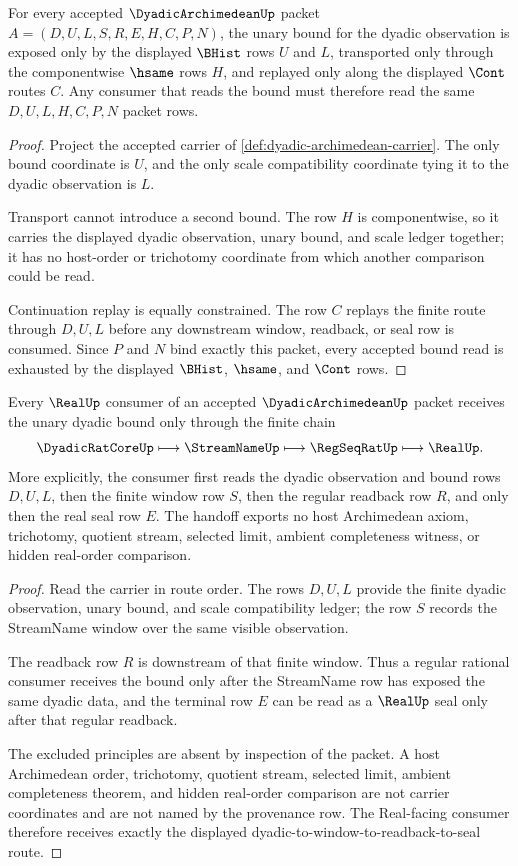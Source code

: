 \begin{theorem}
\label{thm:dyadic-archimedean-unary-bound}
For every accepted $\DyadicArchimedeanUp$ packet $A=(D,U,L,S,R,E,H,C,P,N)$, the unary bound for the dyadic observation is exposed only by the displayed $\BHist$ rows $U$ and $L$, transported only through the componentwise $\hsame$ rows $H$, and replayed only along the displayed $\Cont$ routes $C$. Any consumer that reads the bound must therefore read the same $D,U,L,H,C,P,N$ packet rows.
\end{theorem}
\begin{proof}
Project the accepted carrier of \autoref{def:dyadic-archimedean-carrier}. The only bound coordinate is $U$, and the only scale compatibility coordinate tying it to the dyadic observation is $L$.

Transport cannot introduce a second bound. The row $H$ is componentwise, so it carries the displayed dyadic observation, unary bound, and scale ledger together; it has no host-order or trichotomy coordinate from which another comparison could be read.

Continuation replay is equally constrained. The row $C$ replays the finite route through $D,U,L$ before any downstream window, readback, or seal row is consumed. Since $P$ and $N$ bind exactly this packet, every accepted bound read is exhausted by the displayed $\BHist$, $\hsame$, and $\Cont$ rows.
\end{proof}

\begin{theorem}
\label{thm:dyadic-archimedean-real-seal-handoff}
Every $\RealUp$ consumer of an accepted $\DyadicArchimedeanUp$ packet receives the unary dyadic bound only through the finite chain
$$
\DyadicRatCoreUp\longmapsto\StreamNameUp\longmapsto\RegSeqRatUp\longmapsto\RealUp.
$$
More explicitly, the consumer first reads the dyadic observation and bound rows $D,U,L$, then the finite window row $S$, then the regular readback row $R$, and only then the real seal row $E$. The handoff exports no host Archimedean axiom, trichotomy, quotient stream, selected limit, ambient completeness witness, or hidden real-order comparison.
\end{theorem}
\begin{proof}
Read the carrier in route order. The rows $D,U,L$ provide the finite dyadic observation, unary bound, and scale compatibility ledger; the row $S$ records the StreamName window over the same visible observation.

The readback row $R$ is downstream of that finite window. Thus a regular rational consumer receives the bound only after the StreamName row has exposed the same dyadic data, and the terminal row $E$ can be read as a $\RealUp$ seal only after that regular readback.

The excluded principles are absent by inspection of the packet. A host Archimedean order, trichotomy, quotient stream, selected limit, ambient completeness theorem, and hidden real-order comparison are not carrier coordinates and are not named by the provenance row. The Real-facing consumer therefore receives exactly the displayed dyadic-to-window-to-readback-to-seal route.
\end{proof}

